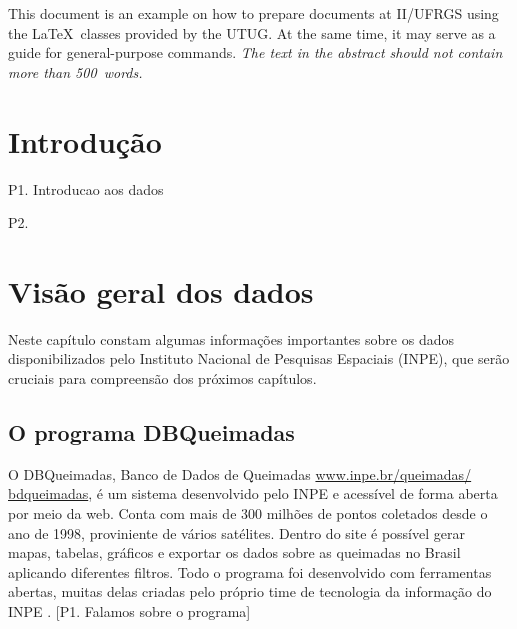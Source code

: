 \documentclass[cic,tc]{iiufrgs}
\begin{document}
\listoffigures

\listoftables

\begin{abstract}
Este documento é um exemplo de como formatar documentos para o
Instituto de Informática da UFRGS usando as classes \LaTeX\
disponibilizadas pelo UTUG\@. Ao mesmo tempo, pode servir de consulta
para comandos mais genéricos. \emph{O texto do resumo não deve
conter mais do que 500 palavras.}
\end{abstract}

\begin{translatedabstract}
This document is an example on how to prepare documents at II/UFRGS
using the \LaTeX\ classes provided by the UTUG\@. At the same time, it
may serve as a guide for general-purpose commands. \emph{The text in
the abstract should not contain more than 500~words.}
\end{translatedabstract}


\chapter{Introdução}
P1. Introducao aos dados \par
P2. 


\chapter{Visão geral dos dados}

Neste capítulo constam algumas informações importantes sobre os 
dados disponibilizados pelo Instituto Nacional de Pesquisas Espaciais (INPE), 
que serão cruciais para compreensão dos próximos capítulos. 

\section{O programa DBQueimadas}

O DBQueimadas, Banco de Dados de Queimadas \url{www.inpe.br/queimadas/
bdqueimadas},
é um sistema desenvolvido pelo INPE e acessível de forma aberta por meio da web. 
Conta com mais de 300 milhões de pontos coletados desde o ano de 1998, 
proviniente de vários satélites. Dentro do site é possível gerar mapas,
tabelas, gráficos e exportar os dados sobre as queimadas no Brasil 
aplicando diferentes filtros. Todo o 
programa foi desenvolvido com ferramentas abertas, muitas delas 
criadas pelo próprio time de tecnologia da informação do INPE 
\citep{setzer2019banco}. [P1. Falamos sobre o programa] \par
\end{document}

